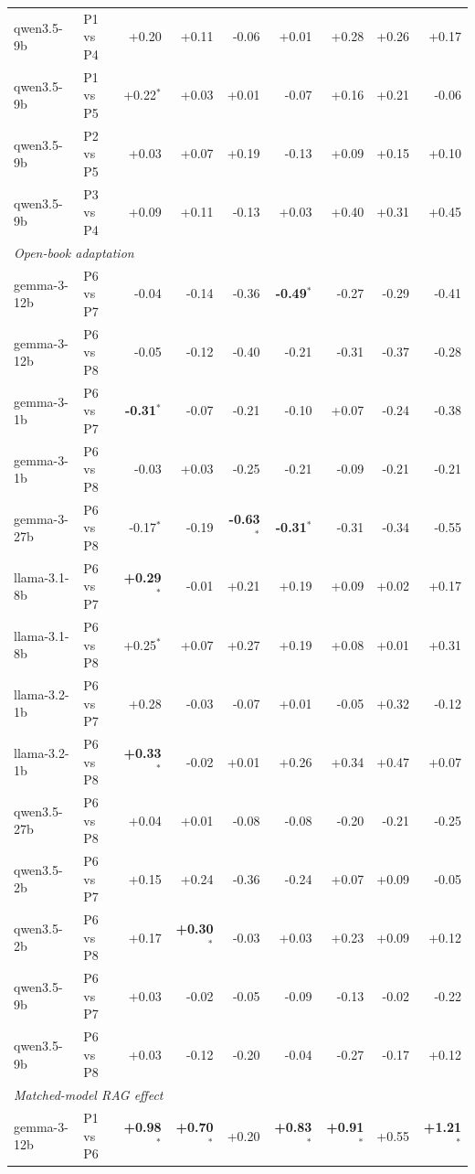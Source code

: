 \begin{table}[p]
\begin{tabular}{llrrrrrrr}
qwen3.5-9b & P1 vs P4 & +0.20 & +0.11 & -0.06 & +0.01 & +0.28 & +0.26 & +0.17 \\
qwen3.5-9b & P1 vs P5 & +0.22$^{*}$ & +0.03 & +0.01 & -0.07 & +0.16 & +0.21 & -0.06 \\
qwen3.5-9b & P2 vs P5 & +0.03 & +0.07 & +0.19 & -0.13 & +0.09 & +0.15 & +0.10 \\
qwen3.5-9b & P3 vs P4 & +0.09 & +0.11 & -0.13 & +0.03 & +0.40 & +0.31 & +0.45 \\
\midrule \multicolumn{9}{l}{\textit{Open-book adaptation}} \\ \midrule
gemma-3-12b & P6 vs P7 & -0.04 & -0.14 & -0.36 & \textbf{-0.49$^{*}$} & -0.27 & -0.29 & -0.41 \\
gemma-3-12b & P6 vs P8 & -0.05 & -0.12 & -0.40 & -0.21 & -0.31 & -0.37 & -0.28 \\
gemma-3-1b & P6 vs P7 & \textbf{-0.31$^{*}$} & -0.07 & -0.21 & -0.10 & +0.07 & -0.24 & -0.38 \\
gemma-3-1b & P6 vs P8 & -0.03 & +0.03 & -0.25 & -0.21 & -0.09 & -0.21 & -0.21 \\
gemma-3-27b & P6 vs P8 & -0.17$^{*}$ & -0.19 & \textbf{-0.63$^{*}$} & \textbf{-0.31$^{*}$} & -0.31 & -0.34 & -0.55 \\
llama-3.1-8b & P6 vs P7 & \textbf{+0.29$^{*}$} & -0.01 & +0.21 & +0.19 & +0.09 & +0.02 & +0.17 \\
llama-3.1-8b & P6 vs P8 & +0.25$^{*}$ & +0.07 & +0.27 & +0.19 & +0.08 & +0.01 & +0.31 \\
llama-3.2-1b & P6 vs P7 & +0.28 & -0.03 & -0.07 & +0.01 & -0.05 & +0.32 & -0.12 \\
llama-3.2-1b & P6 vs P8 & \textbf{+0.33$^{*}$} & -0.02 & +0.01 & +0.26 & +0.34 & +0.47 & +0.07 \\
qwen3.5-27b & P6 vs P8 & +0.04 & +0.01 & -0.08 & -0.08 & -0.20 & -0.21 & -0.25 \\
qwen3.5-2b & P6 vs P7 & +0.15 & +0.24 & -0.36 & -0.24 & +0.07 & +0.09 & -0.05 \\
qwen3.5-2b & P6 vs P8 & +0.17 & \textbf{+0.30$^{*}$} & -0.03 & +0.03 & +0.23 & +0.09 & +0.12 \\
qwen3.5-9b & P6 vs P7 & +0.03 & -0.02 & -0.05 & -0.09 & -0.13 & -0.02 & -0.22 \\
qwen3.5-9b & P6 vs P8 & +0.03 & -0.12 & -0.20 & -0.04 & -0.27 & -0.17 & +0.12 \\
\midrule \multicolumn{9}{l}{\textit{Matched-model RAG effect}} \\ \midrule
gemma-3-12b & P1 vs P6 & \textbf{+0.98$^{*}$} & \textbf{+0.70$^{*}$} & +0.20 & \textbf{+0.83$^{*}$} & \textbf{+0.91$^{*}$} & +0.55 & \textbf{+1.21$^{*}$} \\

\end{tabular}
\end{table}
